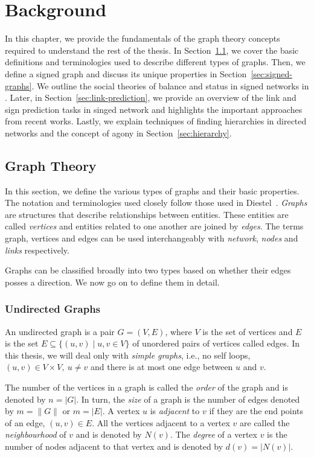 
\chapter{Background}
\label{chp:background}

In this chapter, we provide the fundamentals of the graph theory concepts required to understand the rest of the thesis.
In Section~\ref{sec:prelim}, we cover the basic definitions and terminologies used to describe different types of graphs.
Then, we define a signed graph and discuss its unique properties in Section~\ref{sec:signed-graphs}.
We outline the social theories of balance and status in signed networks in .
Later, in Section~\ref{sec:link-prediction}, we provide an overview of the link and sign prediction tasks in singed network and highlights the important approaches from recent works.
Lastly, we explain techniques of finding hierarchies in directed networks and the concept of agony in Section~\ref{sec:hierarchy}.

\section{Graph Theory}
\label{sec:prelim}
In this section, we define the various types of graphs and their basic properties.
The notation and terminologies used closely follow those used in Diestel~\cite{diestel1997graph}.
\textit{Graphs} are structures that describe relationships between entities.
These entities are called \textit{vertices} and entities related to one another are joined by \textit{edges}.
The terms graph, vertices and edges can be used interchangeably with \textit{network}, \textit{nodes} and \textit{links} respectively.

Graphs can be classified broadly into two types based on whether their edges posses a direction.
We now go on to define them in detail.
\subsection{Undirected Graphs}
An undirected graph is a pair $G=(V,E)$, where $V$ is the set of vertices and $E$ is the set $E \subseteq \{ (u,v) \mid u,v \in V\}$ of unordered pairs of vertices called edges.
In this thesis, we will deal only with \textit{simple graphs}, i.e., no self loops, $(u,v)\in V \times V, ~ u\neq v$ and there is at most one edge between $u$ and $v$. 

The number of the vertices in a graph is called the \textit{order} of the graph and is denoted by $n= |G|$.
In turn, the \textit{size} of a graph is the number of edges denoted by $m = \|G\|$ or $m=|E|$.
A vertex $u$ is \textit{adjacent} to $v$ if they are the end points of an edge, $(u,v) \in E$.
All the vertices adjacent to a vertex $v$ are called the \textit{neighbourhood} of $v$ and is denoted by $N(v)$.
The \textit{degree} of a vertex $v$ is the number of nodes adjacent to that vertex and is denoted by $d(v) = |N(v)|$. 

